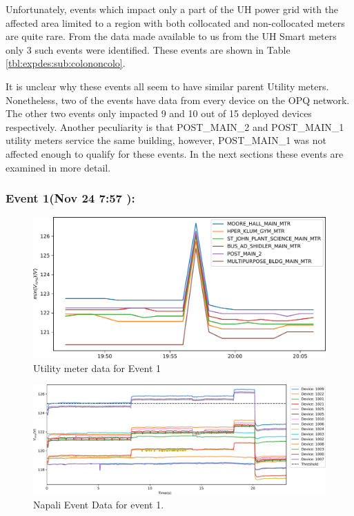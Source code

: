 Unfortunately, events which impact only a part of the UH power grid with the affected area limited to a region with both collocated and non-collocated meters are quite rare.
From the data made available to us from the UH Smart meters only 3 such events were identified.
These events are shown in Table \ref{tbl:expdes:sub:colononcolo}.

It is unclear why these events all seem to have similar parent Utility meters.
Nonetheless, two of the events have data from every device on the OPQ network.
The other two events only impacted 9 and 10 out of 15 deployed devices respectively.
Another peculiarity is that POST\_MAIN\_2 and POST\_MAIN\_1 utility meters service the same building, however, POST\_MAIN\_1 was not affected enough to qualify for these events.
In the next sections these events are examined in more detail.
\subsubsection{Event 1(Nov 24 7:57 ):}
\begin{figure}[!ht]
    \centering
    \includegraphics[width=0.7\linewidth]{img/napali_eval/subthreshold/ev1/ev1_gt.pdf}
    \caption{Utility meter data for Event 1}
    \label{expdes:fig:sub:ev1:gt}
\end{figure}
\begin{figure}[!ht]
    \centering
    \includegraphics[width=1\linewidth]{img/napali_eval/subthreshold/ev1/boxes_combined.pdf}
    \caption{Napali Event Data for event 1.}
    \label{expdes:fig:sub:ev1:boxes}
\end{figure}
